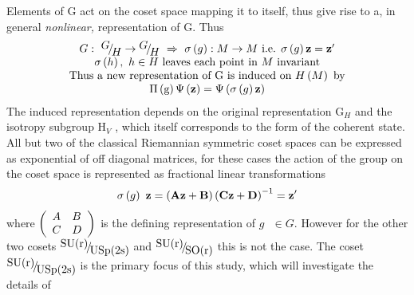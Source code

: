 \documentclass{amsart}
\begin{document}
Elements of G act on the coset space mapping it to itself, thus give rise to
a, in general \textit{nonlinear, }representation of G. Thus
\[
\begin{array}{c}
 G:\mbox{ }\raise0.7ex\hbox{$G$} \!\mathord{\left/ {\vphantom {G
H}}\right.\kern-\nulldelimiterspace}\!\lower0.7ex\hbox{$H$}\to
\raise0.7ex\hbox{$G$} \!\mathord{\left/ {\vphantom {G
H}}\right.\kern-\nulldelimiterspace}\!\lower0.7ex\hbox{$H$}\mbox{
}\Rightarrow \mbox{ }\sigma \left( g \right):M\to M\mbox{ i.e. }\sigma
\left( g \right){\rm {\bf z}}={\rm {\bf {z}'}} \\
 \sigma \left( h \right),\mbox{ }h\in H\mbox{ leaves each point in }M\mbox{
invariant} \\
 \mbox{Thus a new representation of G is induced on }H\left( M \right)\mbox{
by} \\
 \Pi \left( \mbox{g} \right)\Psi \left( {\rm {\bf z}} \right)=\Psi \left(
{\sigma \left( g \right){\rm {\bf z}}} \right) \\
 \end{array}
\]
The induced representation depends on the original representation
$\mbox{G}_H $ and the isotropy subgroup $\mbox{H}_V $ , which itself
corresponds to the form of the coherent state. All but two of the classical
Riemannian symmetric coset spaces can be expressed as exponential of off
diagonal matrices, for these cases the action of the group on the coset
space is represented as fractional linear transformations
\[
\sigma \left( g \right)\mbox{ }{\rm {\bf z}}=\left( {{\rm {\bf Az}}+{\rm
{\bf B}}} \right)\left( {{\rm {\bf Cz}}+{\rm {\bf D}}} \right)^{-1}={\rm
{\bf {z}'}}
\]
where $\left( {{\begin{array}{*{20}c}
 A \hfill & B \hfill \\
 C \hfill & D \hfill \\
\end{array} }} \right)$ is the defining representation of $g\mbox{ }\in G$.
However for the other two cosets $\raise0.7ex\hbox{${\mbox{SU(r)}}$}
\!\mathord{\left/ {\vphantom {{\mbox{SU(r)}}
{\mbox{USp(2s)}}}}\right.\kern-\nulldelimiterspace}\!\lower0.7ex\hbox{${\mbox{USp(2s)}}$}$
and $\raise0.7ex\hbox{${\mbox{SU(r)}}$} \!\mathord{\left/ {\vphantom
{{\mbox{SU(r)}}
{\mbox{SO(r)}}}}\right.\kern-\nulldelimiterspace}\!\lower0.7ex\hbox{${\mbox{SO(r)}}$}$
this is not the case. The coset $\raise0.7ex\hbox{${\mbox{SU(r)}}$}
\!\mathord{\left/ {\vphantom {{\mbox{SU(r)}}
{\mbox{USp(2s)}}}}\right.\kern-\nulldelimiterspace}\!\lower0.7ex\hbox{${\mbox{USp(2s)}}$}$
is the primary focus of this study, which will investigate the details of
\end{document}
